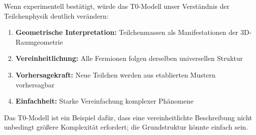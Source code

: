 Wenn experimentell bestätigt, würde das T0-Modell unser Verständnis der Teilchenphysik deutlich verändern:

\begin{enumerate}
	\item \textbf{Geometrische Interpretation:} Teilchenmassen als Manifestationen der 3D-Raumgeometrie
	\item \textbf{Vereinheitlichung:} Alle Fermionen folgen derselben universellen Struktur
	\item \textbf{Vorhersagekraft:} Neue Teilchen werden aus etablierten Mustern vorhersagbar
	\item \textbf{Einfachheit:} Starke Vereinfachung komplexer Phänomene
\end{enumerate}

Das T0-Modell ist ein Beispiel dafür, dass eine vereinheitlichte Beschreibung nicht unbedingt größere Komplexität erfordert; die Grundstruktur könnte einfach sein.

